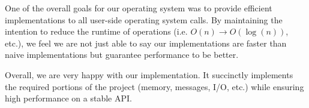 \documentclass[12pt]{report}
\begin{document}
    One of the overall goals for our operating system was to provide efficient
    implementations to all user-side operating system calls. By maintaining the
    intention to reduce the runtime of operations (i.e. $O(n) \to O(\log(n))$,
    etc.), we feel we are not just able to say our implementations are faster
    than naive implementations but guarantee performance to be better.

    Overall, we are very happy with our implementation. It succinctly implements
    the required portions of the project (memory, messages, I/O, etc.) while
    ensuring high performance on a stable API.
\end{document}
